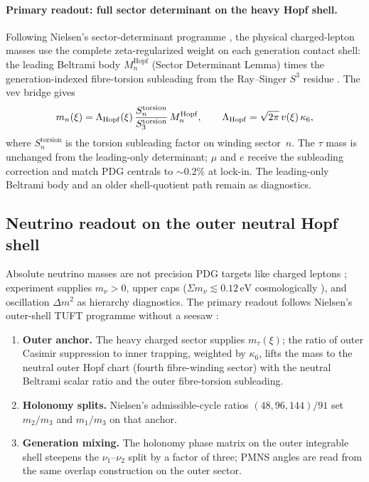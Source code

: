 \documentclass[11pt]{amsart}
\begin{document}
\paragraph{Primary readout: full sector determinant on the heavy Hopf shell.}
Following Nielsen's sector-determinant programme \cite{NielsenTUFT2026,minakshisundaram1949,RaySinger1971}, the physical charged-lepton masses use the complete zeta-regularized weight on each generation contact shell: the leading Beltrami body $M_n^{\mathrm{Hopf}}$ (Sector Determinant Lemma) times the generation-indexed fibre-torsion subleading from the Ray--Singer $S^3$ residue \cite{RaySinger1971,Cheeger1979}. The vev bridge gives
\begin{equation}
  m_n(\xi)
  = \Lambda_{\rm Hopf}(\xi)\,
    \frac{S_n^{\mathrm{torsion}}}{S_3^{\mathrm{torsion}}}\,
    M_n^{\mathrm{Hopf}},
  \qquad
  \Lambda_{\rm Hopf}=\sqrt{2\pi}\,v(\xi)\,\kappa_6,
\end{equation}
where $S_n^{\mathrm{torsion}}$ is the torsion subleading factor on winding sector~$n$. The $\tau$ mass is unchanged from the leading-only determinant; $\mu$ and $e$ receive the subleading correction and match PDG centrals to $\sim 0.2\%$ at lock-in. The leading-only Beltrami body and an older shell-quotient path remain as diagnostics.

\subsection{Neutrino readout on the outer neutral Hopf shell}

Absolute neutrino masses are not precision PDG targets like charged leptons \cite{pdg2024}; experiment supplies $m_\nu>0$, upper caps ($\Sigma m_\nu \lesssim 0.12\,\mathrm{eV}$ cosmologically \cite{planck2018cosmo}), and oscillation $\Delta m^2$ as hierarchy diagnostics. The primary readout follows Nielsen's outer-shell TUFT programme without a seesaw \cite{minkowski1977}:

\begin{enumerate}[label=(\roman*),nosep]
\item \textbf{Outer anchor.} The heavy charged sector supplies $m_\tau(\xi)$; the ratio of outer Casimir suppression to inner trapping, weighted by $\kappa_6$, lifts the mass to the neutral outer Hopf chart (fourth fibre-winding sector) with the neutral Beltrami scalar ratio and the outer fibre-torsion subleading.
\item \textbf{Holonomy splits.} Nielsen's admissible-cycle ratios $(48,96,144)/91$ set
  $m_2/m_3$ and $m_1/m_3$ on that anchor.
\item \textbf{Generation mixing.} The holonomy phase matrix on the outer integrable shell steepens the
  $\nu_1$--$\nu_2$ split by a factor of three; PMNS angles are read from the same overlap construction on the outer sector.
\end{enumerate}
\end{document}
